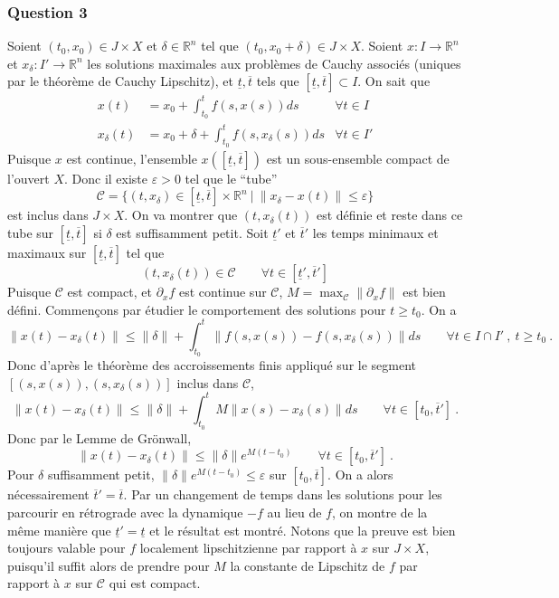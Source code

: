 \hypertarget{answer-gro-3}{%
\subsubsection*{Question 3}\label{answer-gro-3}}


Soient \((t_0,x_0)\in J\times X\) et \(\delta\in \mathbb{R}^n\) tel que
\((t_0,x_0+\delta)\in J\times X\). Soient \(x:I\to \mathbb{R}^n\) et
\(x_\delta : I'\to \mathbb{R}^n\) les solutions maximales aux problèmes
de Cauchy associés (uniques par le théorème de Cauchy Lipschitz), et
\(\underline{t},\overline{t}\) tels que
\([ \underline{t},\overline{t}]\subset I\). On sait que \begin{align*}
x(t)&=x_0  + \int_{t_0}^t f(s,x(s))ds & \forall t\in I\\
x_\delta(t)&=x_0 +\delta  + \int_{t_0}^t f(s,x_\delta(s))ds &\forall t\in I'
\end{align*} Puisque \(x\) est continue, l'ensemble
\(x([ \underline{t},\overline{t}])\) est un sous-ensemble compact de
l'ouvert \(X\). Donc il existe \(\varepsilon>0\) tel que le ``tube'' \[
\mathcal{C}= \{ (t,x_\delta) \in [ \underline{t},\overline{t}]\times \mathbb{R}^n \: | \: \|x_\delta-x(t) \| \leq \varepsilon \} 
\] est inclus dans \(J\times X\). On va montrer que \((t,x_\delta(t))\)
est définie et reste dans ce tube sur \([ \underline{t},\overline{t}]\)
si \(\delta\) est suffisamment petit. Soit \(\underline{t}'\) et
\(\overline{t}'\) les temps minimaux et maximaux sur
\([ \underline{t},\overline{t}]\) tel que \[
(t,x_\delta(t)) \in \mathcal{C}\qquad \forall t\in [ \underline{t}',\overline{t}']
\] Puisque \(\mathcal{C}\) est compact, et \(\partial_x f\) est continue
sur \(\mathcal{C}\), \(M= \max_\mathcal{C}\|\partial_x f\|\) est bien
défini. Commençons par étudier le comportement des solutions pour
\(t\geq t_0\). On a \[
\|x(t)-x_\delta(t)\|\leq \|\delta\| + \int_{t_0}^t \|f(s,x(s))-f(s,x_\delta(s))\|ds \qquad \forall t\in I\cap I' \ , \ t\geq t_0 \ .
\] Donc d'après le théorème des accroissements finis appliqué sur le
segment \([ (s,x(s)),(s,x_\delta(s))]\) inclus dans \(\mathcal{C}\), \[
\|x(t)-x_\delta(t)\|\leq \|\delta\| + \int_{t_0}^t M \|x(s)-x_\delta(s)\|ds \qquad \forall t\in [ t_0,\overline{t}'] \ .
\] Donc par le Lemme de Grönwall, \[
\|x(t)-x_\delta(t)\|\leq \|\delta\|e^{M(t-t_0)} \qquad \forall t\in [ t_0,\overline{t}'] \ .
\] Pour \(\delta\) suffisamment petit,
\(\|\delta\|e^{M(t-t_0)}\leq \varepsilon\) sur \([ t_0,\overline{t}]\). On
a alors nécessairement \(\overline{t}'=\overline{t}\). Par un changement
de temps dans les solutions pour les parcourir en rétrograde avec la
dynamique \(-f\) au lieu de \(f\), on montre de la même manière que
\(\underline{t}'=\underline{t}\) et le résultat est montré. Notons que
la preuve est bien toujours valable pour \(f\) localement lipschitzienne
par rapport à \(x\) sur \(J\times X\), puisqu'il suffit alors de prendre
pour \(M\) la constante de Lipschitz de \(f\) par rapport à \(x\) sur
\(\mathcal{C}\) qui est compact.

